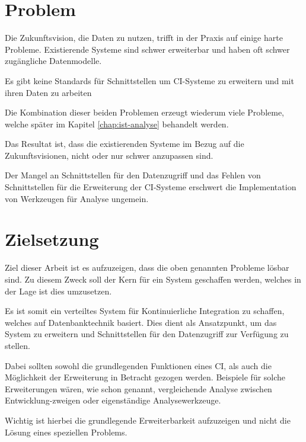 




\section{Problem}

Die Zukunftsvision, die Daten zu nutzen,
trifft in der Praxis auf einige harte Probleme.
Existierende Systeme sind schwer erweiterbar und haben oft schwer zugängliche Datenmodelle.

Es gibt keine Standards für Schnittstellen um CI-Systeme zu erweitern und mit ihren Daten zu arbeiten

Die Kombination dieser beiden Problemen erzeugt wiederum viele Probleme,
welche später im Kapitel \ref{chap:ist-analyse} behandelt werden.

Das Resultat ist, dass die existierenden Systeme im Bezug auf die Zukunftsvisionen,
nicht oder nur schwer anzupassen sind.

Der Mangel an Schnittstellen für den Datenzugriff und
das Fehlen von Schnittstellen für die Erweiterung der CI-Systeme
erschwert die Implementation von Werkzeugen für Analyse ungemein.


\section{Zielsetzung}
Ziel dieser Arbeit ist es  aufzuzeigen, dass die oben genannten Probleme lösbar sind.
Zu diesem Zweck soll der Kern für ein System geschaffen werden,
welches in der Lage ist dies umzusetzen.

Es ist somit ein verteiltes System für Kontinuierliche Integration zu schaffen,
welches auf Datenbanktechnik basiert.
Dies dient als Ansatzpunkt, um das System zu erweitern und
Schnittstellen für den Datenzugriff zur Verfügung zu stellen.

Dabei sollten sowohl die grundlegenden Funktionen eines CI,
als auch die Möglichkeit der Erweiterung in Betracht gezogen werden.
Beispiele für solche Erweiterungen wären, wie schon genannt,
vergleichende Analyse zwischen Entwicklung-zweigen oder eigenständige Analysewerkzeuge.

Wichtig ist hierbei die grundlegende Erweiterbarkeit aufzuzeigen
und nicht die Lösung eines speziellen Problems.

